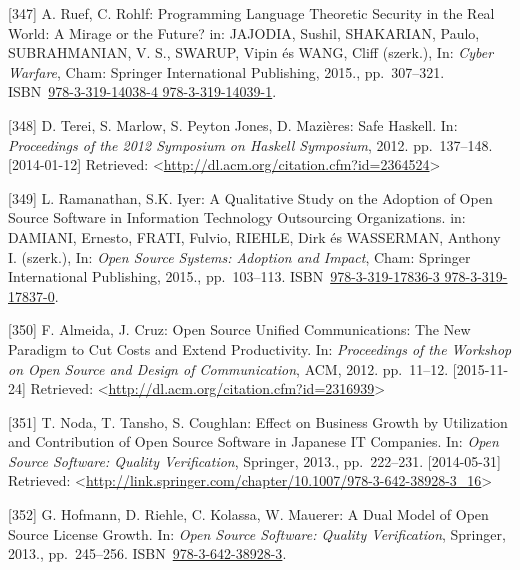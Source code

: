 \documentclass[12pt,magyar,a4paper,oneside]{scrreprt}
\newenvironment{cslreferences}%
  {}%
  {\par}
\begin{document}
\begin{cslreferences}
\leavevmode\hypertarget{ref-jajodia_programming_2015}{}%
{[}347{]} A. Ruef, C. Rohlf: Programming Language Theoretic Security in
the Real World: A Mirage or the Future? in: JAJODIA, Sushil, SHAKARIAN,
Paulo, SUBRAHMANIAN, V. S., SWARUP, Vipin és WANG, Cliff (szerk.), In:
\emph{Cyber Warfare}, Cham: Springer International Publishing, 2015.,
pp.~307--321.
ISBN~\href{https://worldcat.org/isbn/978-3-319-14038-4\%20978-3-319-14039-1}{978-3-319-14038-4 978-3-319-14039-1}.

\leavevmode\hypertarget{ref-terei_safe_2012}{}%
{[}348{]} D. Terei, S. Marlow, S. Peyton Jones, D. Mazières: Safe
Haskell. In: \emph{Proceedings of the 2012 Symposium on Haskell
Symposium}, 2012. pp.~137--148. {[}2014-01-12{]} Retrieved:
\textless{}\url{http://dl.acm.org/citation.cfm?id=2364524}\textgreater{}

\leavevmode\hypertarget{ref-damiani_qualitative_2015}{}%
{[}349{]} L. Ramanathan, S.K. Iyer: A Qualitative Study on the Adoption
of Open Source Software in Information Technology Outsourcing
Organizations. in: DAMIANI, Ernesto, FRATI, Fulvio, RIEHLE, Dirk és
WASSERMAN, Anthony I. (szerk.), In: \emph{Open Source Systems: Adoption
and Impact}, Cham: Springer International Publishing, 2015.,
pp.~103--113.
ISBN~\href{https://worldcat.org/isbn/978-3-319-17836-3\%20978-3-319-17837-0}{978-3-319-17836-3 978-3-319-17837-0}.

\leavevmode\hypertarget{ref-almeida_open_2012}{}%
{[}350{]} F. Almeida, J. Cruz: Open Source Unified Communications: The
New Paradigm to Cut Costs and Extend Productivity. In: \emph{Proceedings
of the Workshop on Open Source and Design of Communication}, ACM, 2012.
pp.~11--12. {[}2015-11-24{]} Retrieved:
\textless{}\url{http://dl.acm.org/citation.cfm?id=2316939}\textgreater{}

\leavevmode\hypertarget{ref-noda_effect_2013}{}%
{[}351{]} T. Noda, T. Tansho, S. Coughlan: Effect on Business Growth by
Utilization and Contribution of Open Source Software in Japanese IT
Companies. In: \emph{Open Source Software: Quality Verification},
Springer, 2013., pp.~222--231. {[}2014-05-31{]} Retrieved:
\textless{}\url{http://link.springer.com/chapter/10.1007/978-3-642-38928-3_16}\textgreater{}

\leavevmode\hypertarget{ref-hofmann_dual_2013}{}%
{[}352{]} G. Hofmann, D. Riehle, C. Kolassa, W. Mauerer: A Dual Model of
Open Source License Growth. In: \emph{Open Source Software: Quality
Verification}, Springer, 2013., pp.~245--256.
ISBN~\href{https://worldcat.org/isbn/978-3-642-38928-3}{978-3-642-38928-3}.


\end{cslreferences}
\end{document}
